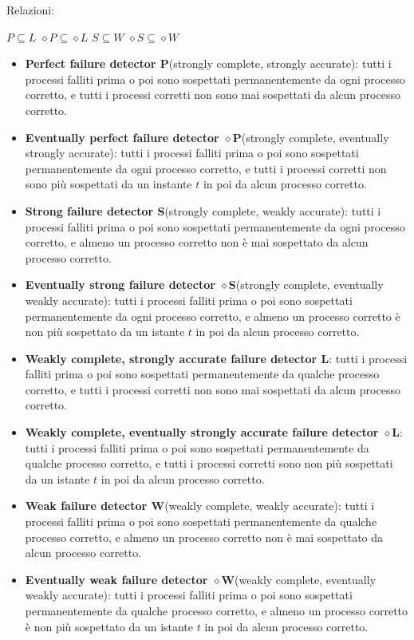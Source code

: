 Relazioni:
\begin{center}
    $P \subseteq L$ \quad \quad $\diamond P \subseteq \diamond L$ \quad \quad $S \subseteq W$ \quad \quad $\diamond S \subseteq \diamond W$
\end{center}
\begin{itemize}
    \item \textbf{Perfect failure detector P}(strongly complete, strongly accurate): tutti i processi falliti prima o poi sono sospettati permanentemente da ogni processo corretto, e tutti i processi corretti non sono mai sospettati da alcun processo corretto. 
    \item \textbf{Eventually perfect failure detector $\diamond $P}(strongly complete, eventually strongly accurate): tutti i processi falliti prima o poi sono sospettati permanentemente da ogni processo corretto, e tutti i processi corretti non sono più sospettati da un instante $t$ in poi da alcun processo corretto. 
    \item \textbf{Strong failure detector S}(strongly complete, weakly accurate): tutti i processi falliti prima o poi sono sospettati permanentemente da ogni processo corretto, e almeno un processo corretto non è mai sospettato da alcun processo corretto. 
    \item \textbf{Eventually strong failure detector $\diamond $S}(strongly complete, eventually weakly accurate): tutti i processi falliti prima o poi sono sospettati permanentemente da ogni processo corretto, e almeno un processo corretto è non più sospettato da un istante $t$ in poi da alcun processo corretto. 
    \item \textbf{Weakly complete, strongly accurate failure detector L}: tutti i processi falliti prima o poi sono sospettati permanentemente da qualche processo corretto, e tutti i processi corretti non sono mai sospettati da alcun processo corretto. 
    \item \textbf{Weakly complete, eventually strongly accurate failure detector $\diamond$L}: tutti i processi falliti prima o poi sono sospettati permanentemente da qualche processo corretto, e tutti i processi corretti sono non più sospettati da un istante $t$ in poi da alcun processo corretto. 
    \item \textbf{Weak failure detector W}(weakly complete, weakly accurate): tutti i processi falliti prima o poi sono sospettati permanentemente da qualche processo corretto, e almeno un processo corretto non è mai sospettato da alcun processo corretto. 
    \item \textbf{Eventually weak failure detector $\diamond$W}(weakly complete, eventually weakly accurate): tutti i processi falliti prima o poi sono sospettati permanentemente da qualche processo corretto, e almeno un processo corretto è non più sospettato da un istante $t$ in poi da alcun processo corretto. 
\end{itemize}


